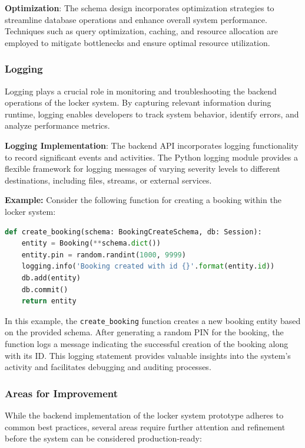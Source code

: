 \textbf{Optimization}:
The schema design incorporates optimization strategies to streamline database operations and enhance overall system performance. Techniques such as query optimization, caching, and resource allocation are employed to mitigate bottlenecks and ensure optimal resource utilization.

\subsubsection{Logging}

Logging plays a crucial role in monitoring and troubleshooting the backend operations of the locker system. By capturing relevant information during runtime, logging enables developers to track system behavior, identify errors, and analyze performance metrics.

\textbf{Logging Implementation}:
The backend API incorporates logging functionality to record significant events and activities. The Python logging module provides a flexible framework for logging messages of varying severity levels to different destinations, including files, streams, or external services.

\textbf{Example:} Consider the following function for creating a booking within the locker system:

\begin{lstlisting}[language=Python]
def create_booking(schema: BookingCreateSchema, db: Session):
    entity = Booking(**schema.dict())
    entity.pin = random.randint(1000, 9999)
    logging.info('Booking created with id {}'.format(entity.id))
    db.add(entity)
    db.commit()
    return entity
\end{lstlisting}

In this example, the \texttt{create\_booking} function creates a new booking entity based on the provided schema. After generating a random PIN for the booking, the function logs a message indicating the successful creation of the booking along with its ID. This logging statement provides valuable insights into the system's activity and facilitates debugging and auditing processes.

\subsubsection{Areas for Improvement}

While the backend implementation of the locker system prototype adheres to common best practices, several areas require further attention and refinement before the system can be considered production-ready:


